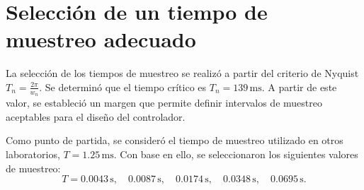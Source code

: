\section{Selección de un tiempo de muestreo adecuado}

La selección de los tiempos de muestreo se realizó a partir del criterio de Nyquist $T_n=\frac{2\pi}{w_n}$. Se determinó que el tiempo crítico es $T_{n} = 139 \, \text{ms}$. A partir de este valor, se estableció un margen que permite definir intervalos de muestreo aceptables para el diseño del controlador.  

Como punto de partida, se consideró el tiempo de muestreo utilizado en otros laboratorios, $T = 1.25 \, \text{ms}$. Con base en ello, se seleccionaron los siguientes valores de muestreo:  
\[
T = 0.0043 \, \text{s}, \quad 0.0087 \, \text{s}, \quad 0.0174 \, \text{s}, \quad 0.0348 \, \text{s}, \quad 0.0695 \, \text{s}.
\]
